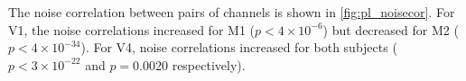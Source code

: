 The noise correlation between pairs of channels is shown in \autoref{fig:pl_noisecor}.
For \ac{V1}, the noise correlations increased for \ac{M1} ($p < 4 \times 10^{-6}$) but decreased for \ac{M2} ($p < 4 \times 10^{-34}$).
For \ac{V4}, noise correlations increased for both subjects ($p < 3 \times 10^{-22}$ and $p=0.0020$ respectively).

%
%
%

